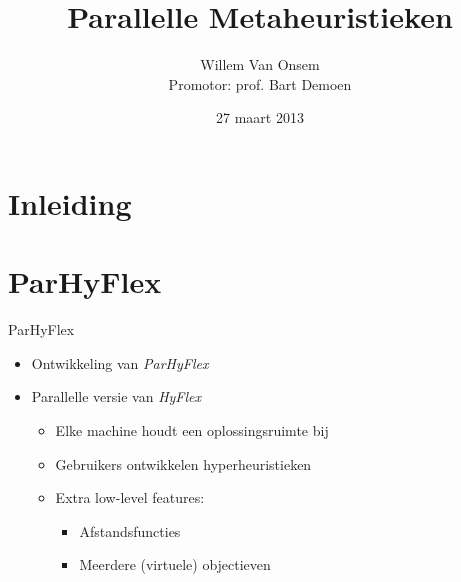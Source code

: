 \documentclass{beamer}
\title{Parallelle Metaheuristieken}
\author{Willem Van Onsem\\Promotor: prof. Bart Demoen}
\date{27 maart 2013}
\begin{document}
\begin{frame}
\maketitle
\end{frame}
\begin{frame}
\tableofcontents
\end{frame}
\section{Inleiding}
\section{ParHyFlex}
\begin{frame}{ParHyFlex}
\begin{itemize}
 \item Ontwikkeling van \emph{ParHyFlex}
 \item Parallelle versie van \emph{HyFlex}
 \begin{itemize}
  \item Elke machine houdt een oplossingsruimte bij
  \item Gebruikers ontwikkelen hyperheuristieken
  \item Extra low-level features:
  \begin{itemize}
   \item Afstandsfuncties
   \item Meerdere (virtuele) objectieven
  \end{itemize}
 \end{itemize}
\end{itemize}
\end{frame}
\end{document}
